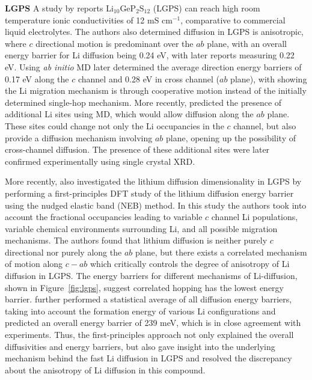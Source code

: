 \documentclass[../main.tex]{subfiles}
\begin{document}
\textbf{LGPS}
A study by \citeauthor{Kamaya2011} reports Li$_{10}$GeP$_2$S$_{12}$ (LGPS) can reach high room temperature ionic conductivities of 12 mS cm$^{-1}$, comparative to commercial liquid electrolytes.\cite{Kamaya2011} The authors also determined diffusion in LGPS is anisotropic, where $c$ directional motion is predominant over the $ab$ plane, with an overall energy barrier for Li diffusion being 0.24 eV, with later reports measuring 0.22 eV.\cite{Kuhn2013b} Using \textit{ab initio} MD \citeauthor{Mo2012} later determined the average direction energy barriers of 0.17 eV along the $c$ channel and 0.28 eV in cross channel ($ab$ plane), \cite{Mo2012} with \citeauthor{Xu2012one} showing the Li migration mechanism is through cooperative motion instead of the initially determined single-hop mechanism.\cite{Xu2012one} More recently, \citeauthor{Adams2012} predicted the presence of additional Li sites using MD, which would allow diffusion along the $ab$ plane.\cite{Adams2012} These sites could change not only the Li occupancies in the $c$ channel, but also provide a diffusion mechanism involving $ab$ plane, opening up the possibility of cross-channel diffusion. The presence of these additional sites were later confirmed experimentally using single crystal XRD.\cite{Kuhn2013a}

More recently, \citeauthor{Bhandari2016} also investigated the lithium diffusion dimensionality in LGPS by performing a first-principles DFT study of the lithium diffusion energy barrier using the nudged elastic band (NEB) method.\cite{Bhandari2016} In this study the authors took into account the fractional occupancies leading to variable $c$ channel Li populations, variable chemical environments surrounding Li, and all possible migration mechanisms. The authors found that lithium diffusion is neither purely $c$ directional nor purely along the $ab$ plane, but there exists a correlated mechanism of motion along $c-ab$ which critically controls the degree of anisotropy of Li diffusion in LGPS. The energy barriers for different mechanisms of Li-diffusion, shown in Figure~\ref{fig:lgps}, suggest correlated hopping has the lowest energy barrier. %
\citeauthor{Bhandari2016} further performed a statistical average of all diffusion energy barriers, taking into account the formation energy of various Li configurations and predicted an overall energy barrier of 239 meV, which is in close agreement with experiments.\cite{Kamaya2011} Thus, the first-principles approach not only explained the overall diffusivities and energy barriers, but also gave insight into the underlying mechanism behind the fast Li diffusion in LGPS and resolved the discrepancy about the anisotropy of Li diffusion in this compound.
\end{document}
